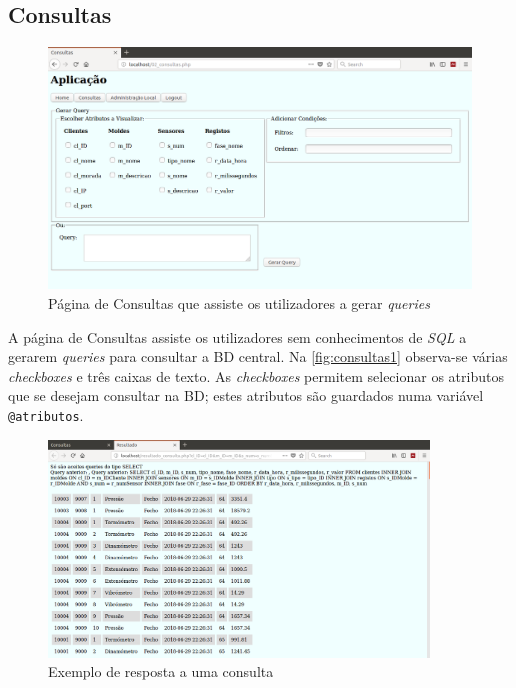 \documentclass[11pt,twoside,a4paper]{report}
\begin{document}
\subsection{Consultas}
\begin{figure}[H]
	\begin{center}
		\includegraphics[width=.9\textwidth]{consultas01} %
		\caption{Página de Consultas que assiste os utilizadores a gerar \textit{queries}}
		\label{fig:consultas1}
	\end{center}
\end{figure}
A página de Consultas assiste os utilizadores sem conhecimentos de \textit{SQL} a gerarem \textit{queries} para consultar a BD central. Na \autoref{fig:consultas1} observa-se várias \textit{checkboxes} e três caixas de texto. As \textit{checkboxes} permitem selecionar os atributos que se desejam consultar na BD; estes atributos são guardados numa variável \texttt{@atributos}.\par 
\newpage
\begin{figure}[H]
	\begin{center}
		\includegraphics[width=0.9\textwidth]{consultas02} %
		\caption{Exemplo de resposta a uma consulta}
		\label{fig:consultas2}
	\end{center}
\end{figure}
\end{document}
